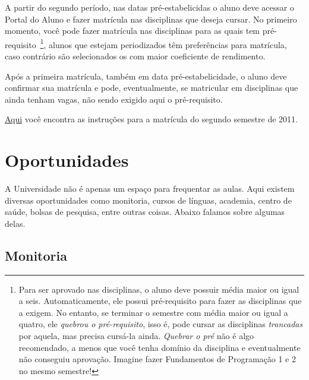 \documentclass[a4paper,12pt,openany]{article}
\begin{document}
A partir do segundo período, nas datas pré-estabelicidas o aluno deve acessar o Portal do Aluno e fazer matrícula nas disciplinas que deseja cursar. No primeiro momento, você pode fazer matrícula nas disciplinas para as quais tem pré-requisito~\footnote{Para ser aprovado nas disciplinas, o aluno deve possuir média maior ou igual a seis. Automaticamente, ele possui pré-requisito para fazer as disciplinas que a exigem. No entanto, se terminar o semestre com média maior ou igual a quatro, ele \textit{quebrou o pré-requisito}, isso é, pode cursar as disciplinas \textit{trancadas} por aquela, mas precisa cursá-la ainda. \textit{Quebrar o pré} não é algo recomendado, a menos que você tenha domínio da disciplina e eventualmente não conseguiu aprovação. Imagine fazer Fundamentos de Programação 1 e 2 no mesmo semestre!}, 
alunos que estejam periodizados têm preferências para matrícula, caso contrário são selecionados os com maior coeficiente de rendimento. 

Após a primeira matrícula, também em data pré-estabelicidade, o aluno deve confirmar sua matrícula e pode, eventualmente, se matricular em disciplinas que ainda tenham vagas, não sendo exigido aqui o pré-requisito. 

 \href{http://www.utfpr.edu.br/curitiba/alunos/08-07-11-instrucao-de-matricula-bacharelados-e-licenciaturas/view}{Aqui} você encontra as instruções para a matrícula do segundo semestre de 2011. 



\newpage
\section{Oportunidades}

A Universidade não é apenas um espaço para frequentar as aulas. Aqui existem diversas oportunidades como monitoria, cursos de línguas, academia, centro de saúde, bolsas de pesquisa, entre outras coisas. Abaixo falamos sobre algumas delas.


\subsection{Monitoria}
\end{document}
